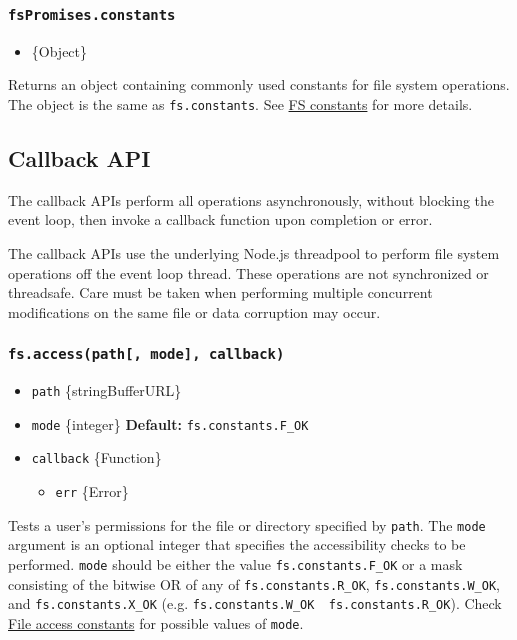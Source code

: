\subsubsection{\texorpdfstring{\texttt{fsPromises.constants}}{fsPromises.constants}}\label{fspromises.constants}

\begin{itemize}
\tightlist
\item
  \{Object\}
\end{itemize}

Returns an object containing commonly used constants for file system
operations. The object is the same as \texttt{fs.constants}. See
\hyperref[fs-constants]{FS constants} for more details.

\subsection{Callback API}\label{callback-api}

The callback APIs perform all operations asynchronously, without
blocking the event loop, then invoke a callback function upon completion
or error.

The callback APIs use the underlying Node.js threadpool to perform file
system operations off the event loop thread. These operations are not
synchronized or threadsafe. Care must be taken when performing multiple
concurrent modifications on the same file or data corruption may occur.

\subsubsection{\texorpdfstring{\texttt{fs.access(path{[},\ mode{]},\ callback)}}{fs.access(path{[}, mode{]}, callback)}}\label{fs.accesspath-mode-callback}

\begin{itemize}
\tightlist
\item
  \texttt{path} \{string\textbar Buffer\textbar URL\}
\item
  \texttt{mode} \{integer\} \textbf{Default:}
  \texttt{fs.constants.F\_OK}
\item
  \texttt{callback} \{Function\}

  \begin{itemize}
  \tightlist
  \item
    \texttt{err} \{Error\}
  \end{itemize}
\end{itemize}

Tests a user's permissions for the file or directory specified by
\texttt{path}. The \texttt{mode} argument is an optional integer that
specifies the accessibility checks to be performed. \texttt{mode} should
be either the value \texttt{fs.constants.F\_OK} or a mask consisting of
the bitwise OR of any of \texttt{fs.constants.R\_OK},
\texttt{fs.constants.W\_OK}, and \texttt{fs.constants.X\_OK} (e.g.
\texttt{fs.constants.W\_OK\ \textbar{}\ fs.constants.R\_OK}). Check
\hyperref[file-access-constants]{File access constants} for possible
values of \texttt{mode}.

